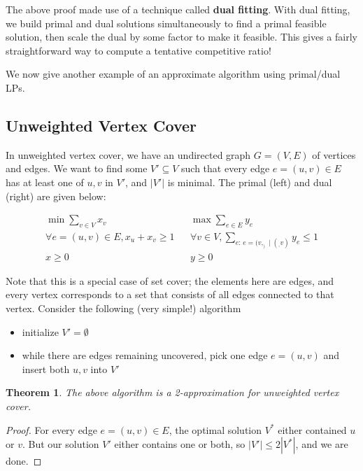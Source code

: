\documentclass[11pt]{article}
\newtheorem{theorem}{Theorem}[section]
\begin{document}
The above proof made use of a technique called \textbf{dual fitting}.  With dual fitting, we build primal and dual solutions simultaneously to find a primal feasible solution, then scale the dual by some factor to make it feasible.  This gives a fairly straightforward way to compute a tentative competitive ratio!

We now give another example of an approximate algorithm using primal/dual LPs.

\subsection{Unweighted Vertex Cover}
In unweighted vertex cover, we have an undirected graph $G = (V, E)$ of vertices and edges.  We want to find some $V' \subseteq V$ such that every edge $e = (u, v) \in E$ has at least one of $u, v$ in $V'$, and $|V'|$ is minimal.  The primal (left) and dual (right) are given below:

\begin{framed}\begin{align*}
\min \sum_{v \in V} x_v && \max \sum_{e \in E} y_e \\
\forall e = (u, v) \in E, x_u + x_v \ge 1 && \forall v \in V, \sum_{e\text{: } e = (v,_) \mid (_, v)} y_e \le 1\\
x \ge 0 && y \ge 0
\end{align*}\end{framed}
Note that this is a special case of set cover; the elements here are edges, and every vertex corresponds to a set that consists of all edges connected to that vertex.  Consider the following (very simple!) algorithm
\begin{itemize}
\setlength\itemsep{0cm}
\item initialize $V' = \emptyset$
\item while there are edges remaining uncovered, pick one edge $e = (u, v)$ and insert both $u, v$ into $V'$
\end{itemize}

\begin{shaded}\begin{theorem}
The above algorithm is a 2-approximation for unweighted vertex cover.
\end{theorem}\end{shaded}

\begin{proof}
For every edge $e = (u, v) \in E$, the optimal solution $V^*$ either contained $u$ or $v$.  But our solution $V'$ either contains one or both, so $|V'| \le 2 |V^*|$, and we are done.
\end{proof}
\end{document}

